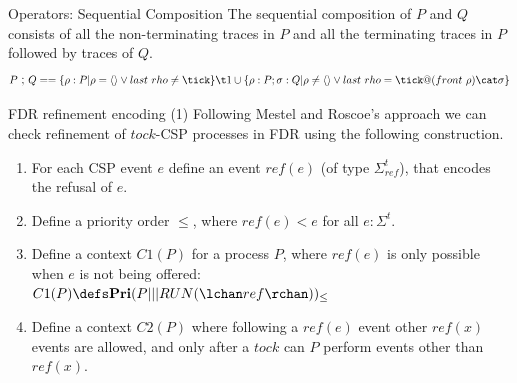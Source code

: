 \documentclass[fleqn]{beamer}
\newenvironment{slide-nocite}[1]
{\begin{frame}[fragile,environment=slide-nocite]
\frametitle{#1}\begin{refsegment}}
{\end{refsegment}\end{frame}}%
\begin{document}
\begin{slide-nocite}{Operators: Sequential Composition}
  The sequential composition of $P$ and $Q$ consists of all the
  non-terminating traces in $P$ and all the terminating traces in $P$
  followed by traces of $Q$.
  \begin{displaymath}
    P \circseq Q == \{ \rho : P | \rho = \langle\rangle \lor last~rho \neq \tick\} \\
    \t1 {} \cup \{ \rho : P; \sigma : Q | \rho \neq \langle\rangle \lor last~rho = \tick @ (front~\rho) \cat \sigma \}
  \end{displaymath}
\end{slide-nocite}

\begin{slide-nocite}{FDR refinement encoding (1)}
Following Mestel and Roscoe's approach we can check refinement of $tock$-CSP processes
in FDR using the following construction.
\begin{enumerate}
  \item For each CSP event $e$ define an event $ref(e)$ (of type $\Sigma^{t}_{ref}$), that encodes the refusal of $e$.
  \item Define a priority order $\leq$, where $ref(e) < e$ for all $e : \Sigma^{t}$.
  \item Define a context $C1(P)$ for a process $P$, where $ref(e)$ is only possible
        when $e$ is not being offered:\\
        $C1(P) \circdef \mathbf{Pri}(P ||| RUN(\lchan ref\rchan))_{\leq}$
  \item Define a context $C2(P)$ where following a $ref(e)$ event other $ref(x)$ events are
        allowed, and only after a $tock$ can $P$ perform events other than $ref(x)$.
\end{enumerate}
\end{slide-nocite}
\end{document}

